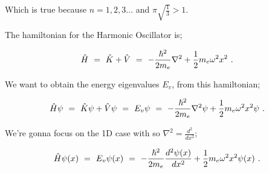 \documentclass{article}
\newcounter{subsubsubsection}[subsubsection]
\begin{document}
Which is true because \begin{math} n = 1, 2, 3... \end{math} and \begin{math} \pi \sqrt{\frac{1}{3}} > 1 \end{math}. 

The hamiltonian for the Harmonic Oscillator is;

\begin{equation} \label{eb-eq-256-1}
\hat{H} \hspace{0.125cm} = \hspace{0.125cm} \hat{K} + \hat{V} \hspace{0.125cm} = \hspace{0.125cm} -\frac{\hbar^2}{2 m_e} \nabla^2 + \frac{1}{2} m_e \omega^2 x^2 \hspace{0.125cm} .
\end{equation}

We want to obtain the energy eigenvalues \begin{math} E_v \end{math}, from this hamiltonian;

\begin{equation} \label{eb-eq-256-2}
\hat{H}\psi \hspace{0.125cm} = \hspace{0.125cm} \hat{K} \psi + \hat{V} \psi \hspace{0.125cm} = \hspace{0.125cm} E_v \psi \hspace{0.125cm} = \hspace{0.125cm} -\frac{\hbar^2}{2 m_e} \nabla^2 \psi + \frac{1}{2} m_e \omega^2 x^2 \psi \hspace{0.125cm} .
\end{equation}

We're gonna focus on the 1D case with so \begin{math} \nabla^2 = \frac{d^2}{dx^2} \end{math};

\begin{equation} \label{eb-eq-256-3}
\hat{H}\psi(x) \hspace{0.125cm} = \hspace{0.125cm} E_v \psi(x) \hspace{0.125cm} = \hspace{0.125cm} -\frac{\hbar^2}{2 m_e} \frac{d^2 \psi(x)}{dx^2} + \frac{1}{2} m_e \omega^2 x^2 \psi(x) \hspace{0.125cm} .
\end{equation}
\end{document}
